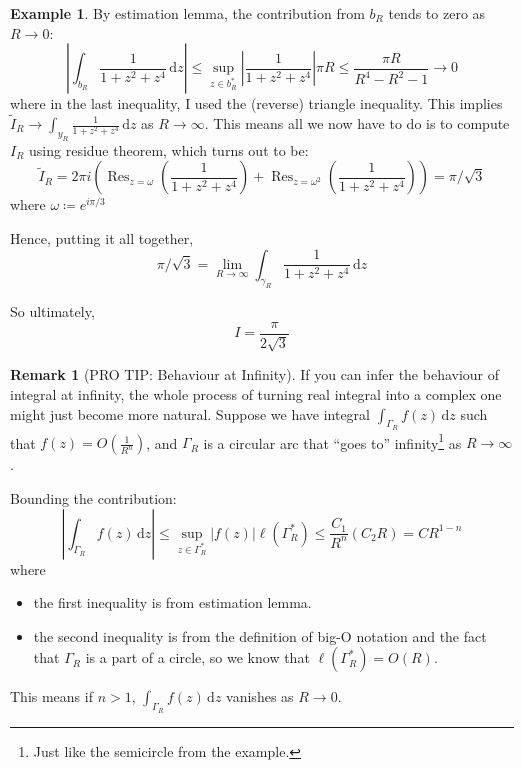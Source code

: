 \documentclass[a4paper, 12pt]{article}
\theoremstyle{definition}
\newtheorem{example}{Example}
\newtheorem{remark}{Remark}
\numberwithin{theorem}{section}
\numberwithin{definition}{section}
\numberwithin{exercise}{section}
\numberwithin{remark}{section}
\numberwithin{figure}{section}
\numberwithin{example}{section}
\newcommand{\intd}{\,\text{d}}
\DeclareMathOperator{\res}{Res}
\begin{document}
\begin{example}
    By estimation lemma, the contribution from $b_R$ tends to zero as $R \rightarrow 0$:
    \begin{equation*}
        \left| \int_{b_R} \frac{1}{1+z^2+z^4} \intd z \right|
        \leq \sup_{z \in b_R^*} \left|\frac{1}{1+z^2+z^4}\right| \pi R
        \leq \frac{\pi R}{R^4 - R^2 - 1} \rightarrow 0
    \end{equation*}
    where in the last inequality, I used the (reverse) triangle inequality.
    This implies $\tilde I_R \rightarrow \int_{y_R} \frac{1}{1+z^2+z^4}\intd z$ as $R \rightarrow \infty$.
    This means all we now have to do is to compute $I_R$ using residue theorem, which turns out to be:
    \begin{equation*}
        \tilde I_R = 2 \pi i \left( \res_{z=\omega} \left( \frac{1}{1+z^2+z^4} \right) + \res_{z=\omega^2} \left( \frac{1}{1+z^2+z^4} \right) \right)
        = \pi/\sqrt{3}
    \end{equation*}
    where $\omega\coloneqq e^{i\pi/3}$ 

    Hence, putting it all together,
    \begin{equation*}
        \pi/\sqrt{3} = \lim_{R\rightarrow\infty}\int_{\gamma_R}\frac{1}{1+z^2+z^4} \intd z
    \end{equation*}

    So ultimately,
    \begin{equation*}
        I = \frac{\pi}{2\sqrt{3}}
    \end{equation*}
\end{example}
\begin{remark}[PRO TIP: Behaviour at Infinity]
    If you can infer the behaviour of integral at infinity,
    the whole process of turning real integral into a complex one
    might just become more natural.
    Suppose we have integral $\int_{\Gamma_R} f(z) \intd z$
    such that $f(z) = O\left( \frac{1}{R^n} \right)$,
    and $\Gamma_R$ is a circular arc that ``goes to'' infinity\footnote{Just like the semicircle from the example.} as $R \rightarrow \infty$.

    Bounding the contribution:
    \begin{equation*}
        \left|\int_{\Gamma_R} f(z) \intd z \right|
        \leq \sup_{z \in \Gamma_R^*} |f(z)| \ell(\Gamma_R^*)
        \leq \frac{C_1}{R^n} \left(C_2 R\right)
        =C R^{1-n}
    \end{equation*}
    where
    \begin{itemize}
        \item the first inequality is from estimation lemma.
        \item the second inequality is from the definition of big-O notation and the fact that $\Gamma_R$ is a part of a circle, so we know that $\ell\left( \Gamma_R^* \right) = O\left( R \right)$.
    \end{itemize}
    This means if $n>1$, $\int_{\Gamma_R} f(z) \intd z$ vanishes as $R \rightarrow 0$.
\end{remark}
\end{document}
